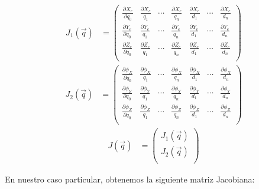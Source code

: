 \documentclass[a4paper,12pt]{article}
\begin{document}
\begin{align}
    J_1(\vec{q}) & =
    \begin{pmatrix}
        \frac{\partial X_e}{\partial q_0} & \frac{\partial X_e}{q_1} & \cdots & \frac{\partial X_e}{q_n} & \frac{\partial X_e}{d_1} & \cdots & \frac{\partial X_e}{d_n} \\
        \frac{\partial Y_e}{\partial q_0} & \frac{\partial Y_e}{q_1} & \cdots & \frac{\partial Y_e}{q_n} & \frac{\partial Y_e}{d_1} & \cdots & \frac{\partial Y_e}{d_n} \\
        \frac{\partial Z_e}{\partial q_0} & \frac{\partial Z_e}{q_1} & \cdots & \frac{\partial Z_e}{q_n} & \frac{\partial Z_e}{d_1} & \cdots & \frac{\partial Z_e}{d_n} \\
    \end{pmatrix} \label{eq:jacobian_1}
\end{align}
\begin{align}
    J_2(\vec{q}) & =
    \begin{pmatrix}
        \frac{\partial \phi_X}{\partial q_0} & \frac{\partial \phi_X}{q_1} & \cdots & \frac{\partial \phi_X}{q_n} & \frac{\partial \phi_X}{d_1} & \cdots & \frac{\partial \phi_X}{d_n} \\
        \frac{\partial \phi_Y}{\partial q_0} & \frac{\partial \phi_Y}{q_1} & \cdots & \frac{\partial \phi_Y}{q_n} & \frac{\partial \phi_Y}{d_1} & \cdots & \frac{\partial \phi_Y}{d_n} \\
        \frac{\partial \phi_Z}{\partial q_0} & \frac{\partial \phi_Z}{q_1} & \cdots & \frac{\partial \phi_Z}{q_n} & \frac{\partial \phi_Z}{d_1} & \cdots & \frac{\partial \phi_Z}{d_n} \\
    \end{pmatrix} \label{eq:jacobian_2}
\end{align}
\begin{align}
    J(\vec{q}) & =
    \begin{pmatrix}
        J_1(\vec{q}) \\
        J_2(\vec{q}) \\
    \end{pmatrix} \label{eq:jacobian}
\end{align}

En nuestro caso particular, obtenemos la siguiente matriz Jacobiana:
\end{document}
